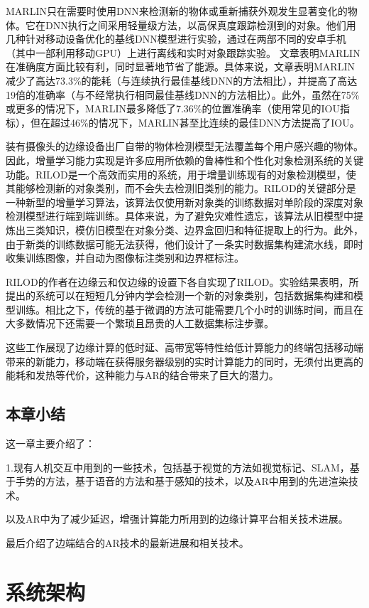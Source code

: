 MARLIN只在需要时使用DNN来检测新的物体或重新捕获外观发生显著变化的物体。它在DNN执行之间采用轻量级方法，以高保真度跟踪检测到的对象。他们用几种针对移动设备优化的基线DNN模型进行实验，通过在两部不同的安卓手机（其中一部利用移动GPU）上进行离线和实时对象跟踪实验。
文章表明MARLIN在准确度方面比较有利，同时显著地节省了能源。具体来说，文章表明MARLIN减少了高达73.3\%的能耗（与连续执行最佳基线DNN的方法相比），并提高了高达19倍的准确率（与不经常执行相同最佳基线DNN的方法相比）。此外，虽然在75\%或更多的情况下，MARLIN最多降低了7.36\%的位置准确率（使用常见的IOU指标），但在超过46\%的情况下，MARLIN甚至比连续的最佳DNN方法提高了IOU。

装有摄像头的边缘设备出厂自带的物体检测模型无法覆盖每个用户感兴趣的物体。因此，增量学习能力实现是许多应用所依赖的鲁棒性和个性化对象检测系统的关键功能。RILOD\cite{LiTasGho19}是一个高效而实用的系统，用于增量训练现有的对象检测模型，使其能够检测新的对象类别，而不会失去检测旧类别的能力。RILOD的关键部分是一种新型的增量学习算法，该算法仅使用新对象类的训练数据对单阶段的深度对象检测模型进行端到端训练。具体来说，为了避免灾难性遗忘，该算法从旧模型中提炼出三类知识，模仿旧模型在对象分类、边界盒回归和特征提取上的行为。此外，由于新类的训练数据可能无法获得，他们设计了一条实时数据集构建流水线，即时收集训练图像，并自动为图像标注类别和边界框标注。

RILOD的作者在边缘云和仅边缘的设置下各自实现了RILOD。实验结果表明，所提出的系统可以在短短几分钟内学会检测一个新的对象类别，包括数据集构建和模型训练。相比之下，传统的基于微调的方法可能需要几个小时的训练时间，而且在大多数情况下还需要一个繁琐且昂贵的人工数据集标注步骤。

这些工作展现了边缘计算的低时延、高带宽等特性给低计算能力的终端包括移动端带来的新能力，移动端在获得服务器级别的实时计算能力的同时，无须付出更高的能耗和发热等代价，这种能力与AR的结合带来了巨大的潜力。

\section{本章小结}
这一章主要介绍了：

1.现有人机交互中用到的一些技术，包括基于视觉的方法如视觉标记、SLAM，基于手势的方法，基于语音的方法和基于感知的技术，以及AR中用到的先进渲染技术。

以及AR中为了减少延迟，增强计算能力所用到的边缘计算平台相关技术进展。

最后介绍了边端结合的AR技术的最新进展和相关技术。


\chapter{系统架构}
\label{chap:architec}

